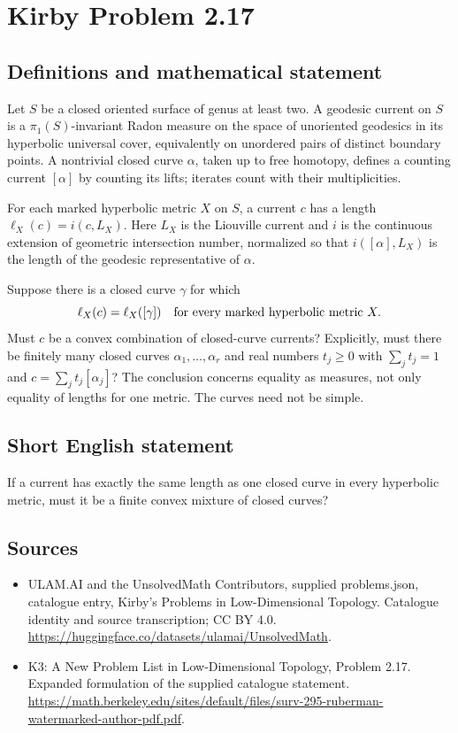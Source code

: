 \documentclass[11pt,a4paper]{article}
\begin{document}
\section*{Kirby Problem 2.17}\label{statement}

\subsection{Definitions and mathematical statement}
Let $S$ be a closed oriented surface of genus at least two. A geodesic current
on $S$ is a $\pi_1(S)$-invariant Radon measure on the space of unoriented
geodesics in its hyperbolic universal cover, equivalently on unordered pairs
of distinct boundary points. A nontrivial closed curve $\alpha$, taken up to
free homotopy, defines a counting current $[\alpha]$ by counting its lifts;
iterates count with their multiplicities.

For each marked hyperbolic metric $X$ on $S$, a current $c$ has a length
$\ell_X(c)=i(c,L_X)$. Here $L_X$ is the Liouville current and $i$ is the
continuous extension of geometric intersection number, normalized so that
$i([\alpha],L_X)$ is the length of the geodesic representative of $\alpha$.

Suppose there is a closed curve $\gamma$ for which
\[
 \ell_X(c)=\ell_X([\gamma])\quad\hbox{for every marked hyperbolic metric }X.
\]
Must $c$ be a convex combination of closed-curve currents? Explicitly, must
there be finitely many closed curves $\alpha_1,\ldots,\alpha_r$ and real
numbers $t_j\geq0$ with $\sum_jt_j=1$ and
$c=\sum_jt_j[\alpha_j]$? The conclusion concerns equality as measures, not
only equality of lengths for one metric. The curves need not be simple.
\subsection{Short English statement}
If a current has exactly the same length as one closed curve in every hyperbolic metric, must it be a finite convex mixture of closed curves?
\subsection{Sources}
\begin{itemize}
\item[S1] ULAM.AI and the UnsolvedMath Contributors, supplied problems.json, catalogue entry, Kirby's Problems in Low-Dimensional Topology. Catalogue identity and source transcription; CC BY 4.0.
\url{https://huggingface.co/datasets/ulamai/UnsolvedMath}.
\item[S2] K3: A New Problem List in Low-Dimensional Topology, Problem 2.17. Expanded formulation of the supplied catalogue statement.
\url{https://math.berkeley.edu/sites/default/files/surv-295-ruberman-watermarked-author-pdf.pdf}.
\end{itemize}
\end{document}
